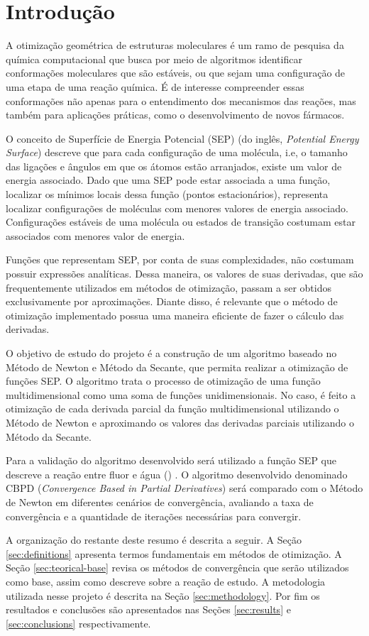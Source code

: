 \section{Introdução}

A otimização geométrica de estruturas moleculares é um ramo de pesquisa da química
computacional que busca por meio de algoritmos identificar conformações moleculares que
são estáveis, ou que sejam uma configuração de uma etapa de uma reação química. É de interesse compreender essas conformações não apenas para o entendimento dos mecanismos das reações, mas também para aplicações práticas, como o desenvolvimento de novos fármacos.

O conceito de Superfície de Energia Potencial (SEP) (do inglês, \textit{Potential Energy Surface}) descreve que para cada configuração de uma molécula, i.e, o tamanho das ligações e ângulos em que os átomos estão arranjados, existe um valor de energia associado. Dado que uma SEP pode estar associada a uma função, localizar os mínimos locais dessa função (pontos estacionários), representa localizar configurações de moléculas com menores valores de energia associado. Configurações estáveis de uma molécula ou estados de transição costumam estar associados com menores valor de energia. %

Funções que representam SEP, por conta de suas complexidades, não costumam possuir expressões analíticas. Dessa maneira, os valores de suas derivadas, que são frequentemente utilizados em métodos de otimização, passam a ser obtidos  exclusivamente por aproximações. Diante disso, é relevante que o método de otimização implementado possua uma maneira eficiente de fazer o cálculo das derivadas.

O objetivo de estudo do projeto é a construção de um algoritmo baseado no Método de Newton e Método da Secante, que permita realizar a otimização de funções SEP. O algoritmo trata o processo de otimização de uma função multidimensional como uma soma de funções unidimensionais. No caso, é feito a otimização de cada derivada parcial da função multidimensional utilizando o Método de Newton e aproximando os valores das derivadas parciais utilizando o Método da Secante.

Para a validação do algoritmo desenvolvido será utilizado a função SEP que descreve a reação entre fluor e água () \cite{fh2o_first_sep}. O algoritmo desenvolvido denominado CBPD (\textit{Convergence Based in Partial Derivatives}) será comparado com o Método de Newton em diferentes cenários de convergência, avaliando a taxa de convergência e a quantidade de iterações necessárias para convergir.

A organização do restante deste resumo é descrita a seguir. A Seção \ref{sec:definitions} apresenta termos fundamentais em métodos de otimização. A Seção \ref{sec:teorical-base} revisa os métodos de convergência que serão utilizados como base, assim como descreve sobre a reação de estudo. A metodologia utilizada nesse projeto é descrita na Seção \ref{sec:methodology}. Por fim os resultados e conclusões são apresentados nas Seções \ref{sec:results} e \ref{sec:conclusions} respectivamente.
